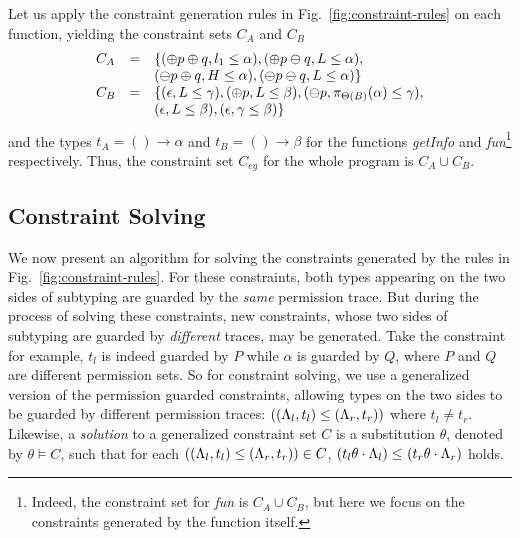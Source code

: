 {{{Let us apply the constraint generation rules in Fig.~\ref{fig:constraint-rules} on each function, yielding the constraint sets $C_A$ and $C_B$
\[
\begin{array}{lcl}
C_A & =  &\{(\oplus p\oplus q, l_1 \leq \alpha),(\oplus p\ominus q, L \leq \alpha), \\
 & & (\ominus p\oplus q, H \leq \alpha), (\ominus p\ominus q, L \leq \alpha) \}\\
C_B & =  & \{(\epsilon, L\leq\gamma), (\oplus p, L\leq\beta) ,(\ominus p, \pi_{{\Theta(B)}}({\alpha})\leq\gamma), \\
& & (\epsilon, L\leq\beta),(\epsilon, \gamma\leq\beta)  \}
\end{array}
\]
and the types $t_A =()\rightarrow \alpha$  and $t_B=()\rightarrow \beta$ for the functions  \textit{getInfo} and  \textit{fun}\footnote{Indeed, the constraint set for \textit{fun} is $C_A \cup C_B $, but here we focus on the constraints generated by the function itself.} respectively. Thus, the constraint set $C_{eg}$ for the whole program is $C_A \cup C_B$.

 \subsection{Constraint Solving}\label{sec:constraint_solve}
We now present an algorithm for solving the constraints generated by the rules in Fig.~\ref{fig:constraint-rules}.
For these constraints, both types appearing on the two sides of subtyping are
guarded by the \emph{same} permission trace. But during the process of solving these constraints, new constraints, whose two sides of subtyping are guarded by \emph{different} traces, may be generated.
Take the constraint  for example,
$t_l$ is indeed guarded by $P$ while $\alpha$ is guarded by $Q$, where $P$ and $Q$ are different permission sets.
So for constraint solving, we use a generalized version of the permission guarded constraints, allowing types on the two sides to be guarded by different permission traces:
$
((\Lambda_l,t_l)\leq(\Lambda_r,t_r))
$
where $t_l \not = t_r.$
Likewise, a \emph{solution} to a generalized constraint set $C$ is a substitution $\theta$, denoted by $\theta \vDash C$,  such that for each $((\Lambda_l,t_l)\leq(\Lambda_r,t_r)) \in C$, $(t_l\theta\cdot \Lambda_l) \leq_{} (t_r\theta \cdot \Lambda_r)$ holds.

}}}
